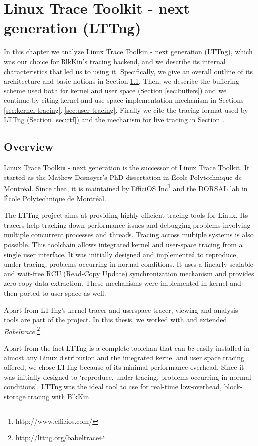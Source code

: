 \chapter{Linux Trace Toolkit - next generation (LTTng)}\label{ch:lttng}

In this chapter we analyze Linux Trace Toolkin - next generation (LTTng), which
was our choice for BlkKin's tracing backend, and we describe its internal
characteristics that led us to using it. Specifically, we give an overall
outline of its architecture and basic notions in Section
\ref{sec:lttng-overview}. Then, we describe the buffering scheme used both for
kernel and user space (Section \ref{sec:buffers}) and we continue by citing
kernel and use space implementation mechanism in Sections
\ref{sec:kernel-tracing}, \ref{sec:user-tracing}. Finally we cite the tracing
format used by LTTng (Section \ref{sec:ctf}) and the mechanism for live tracing
in Section \label{sec:relayd}.

\section{Overview}\label{sec:lttng-overview}

Linux Trace Toolkin - next generation is the successor of Linux Trace Toolkit.
It started as the Mathew Desnoyer's PhD dissertation \cite{desnoyer} in École
Polytechnique de Montréal. Since then, it is maintained by EfficiOS
Inc\footnote{http://www.efficios.com/} and the DORSAL lab in  École
Polytechnique de Montréal.

The LTTng project aims at providing highly efficient tracing tools for Linux.
Its tracers help tracking down performance issues and debugging problems
involving multiple concurrent processes and threads. Tracing across multiple
systems is also possible. This toolchain allows integrated kernel and user-space
tracing from a single user interface. It was initially designed and implemented
to reproduce, under tracing, problems occurring in normal conditions. It uses a
linearly scalable and wait-free RCU (Read-Copy Update) synchronization mechanism
and provides zero-copy data extraction. These mechanisms were implemented in
kernel and then ported to user-space as well.
 
Apart from LTTng's kernel tracer and userspace tracer, viewing and analysis
tools are part of the project. In this thesis, we worked with and extended 
\textit{Babeltrace} \footnote{http://lttng.org/babeltrace}.

Apart from the fact LTTng is a complete toolchan that can be easily installed in
almost any Linux distribution and the integrated kernel and user space tracing
offered, we chose LTTng because of its minimal performance overhead. Since it
was initially designed to `reproduce, under tracing, problems occurring in
normal conditions', LTTng was the ideal tool to use for real-time low-overhead,
block-storage tracing with BlkKin.

